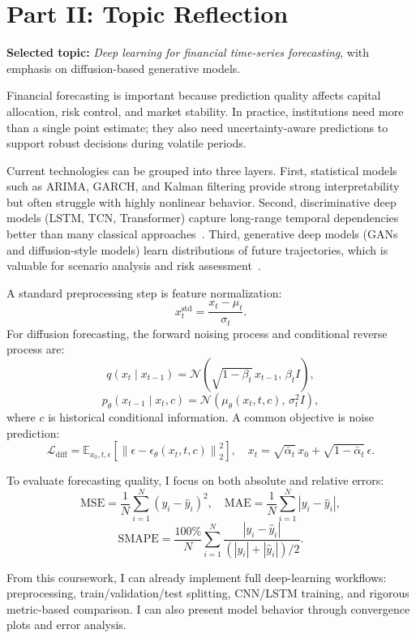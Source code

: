 \section{Part II: Topic Reflection}
\label{sec:reflection}

\textbf{Selected topic:} \emph{Deep learning for financial time-series forecasting}, with emphasis on diffusion-based generative models.

Financial forecasting is important because prediction quality affects capital allocation, risk control, and market stability. In practice, institutions need more than a single point estimate; they also need uncertainty-aware predictions to support robust decisions during volatile periods.

Current technologies can be grouped into three layers. First, statistical models such as ARIMA, GARCH, and Kalman filtering provide strong interpretability but often struggle with highly nonlinear behavior. Second, discriminative deep models (LSTM, TCN, Transformer) capture long-range temporal dependencies better than many classical approaches~\cite{hochreiter1997lstm}. Third, generative deep models (GANs and diffusion-style models) learn distributions of future trajectories, which is valuable for scenario analysis and risk assessment~\cite{goodfellow2014gan}.

A standard preprocessing step is feature normalization:
\[
x_t^{\mathrm{std}} = \frac{x_t - \mu_t}{\sigma_t}.
\]
For diffusion forecasting, the forward noising process and conditional reverse process are:
\[
q(x_t\mid x_{t-1}) = \mathcal{N}(\sqrt{1-\beta_t}\,x_{t-1},\,\beta_t I),
\]
\[
p_{\theta}(x_{t-1}\mid x_t, c) = \mathcal{N}(\mu_{\theta}(x_t,t,c),\,\sigma_t^2 I),
\]
where $c$ is historical conditional information. A common objective is noise prediction:
\[
\mathcal{L}_{\mathrm{diff}} = \mathbb{E}_{x_0,t,\epsilon}\left[\left\lVert \epsilon - \epsilon_{\theta}(x_t,t,c) \right\rVert_2^2\right],
\quad
x_t = \sqrt{\bar{\alpha}_t}\,x_0 + \sqrt{1-\bar{\alpha}_t}\,\epsilon.
\]

To evaluate forecasting quality, I focus on both absolute and relative errors:
\[
\mathrm{MSE} = \frac{1}{N}\sum_{i=1}^{N}(y_i-\hat{y}_i)^2,
\quad
\mathrm{MAE} = \frac{1}{N}\sum_{i=1}^{N}|y_i-\hat{y}_i|,
\]
\[
\mathrm{SMAPE} = \frac{100\%}{N}\sum_{i=1}^{N}\frac{|y_i-\hat{y}_i|}{(|y_i|+|\hat{y}_i|)/2}.
\]

From this coursework, I can already implement full deep-learning workflows: preprocessing, train/validation/test splitting, CNN/LSTM training, and rigorous metric-based comparison. I can also present model behavior through convergence plots and error analysis.

